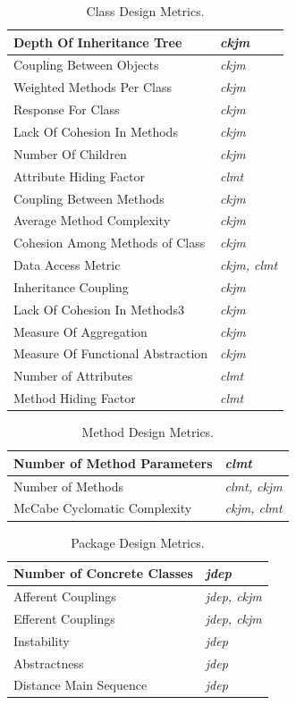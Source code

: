 \documentclass[conference]{IEEEtran}
\begin{document}
\begin{table}[!t]
\caption{Class Design Metrics.}
\label{tbl:class-selected-metrics}
\centering
\begin{tabular}{|l||l|}
\hline
Depth Of Inheritance Tree & \textit{ckjm}\\
\hline
Coupling Between Objects & \textit{ckjm}\\
\hline
Weighted Methods Per Class & \textit{ckjm}\\
\hline
Response For Class & \textit{ckjm}\\
\hline
Lack Of Cohesion In Methods & \textit{ckjm}\\
\hline
Number Of Children & \textit{ckjm}\\
\hline
Attribute Hiding Factor & \textit{clmt}\\
\hline
Coupling Between Methods & \textit{ckjm}\\
\hline
Average Method Complexity & \textit{ckjm}\\
\hline
Cohesion Among Methods of Class & \textit{ckjm}\\
\hline
Data Access Metric & \textit{ckjm, clmt}\\
\hline
Inheritance Coupling & \textit{ckjm}\\
\hline
Lack Of Cohesion In Methods3 & \textit{ckjm}\\
\hline
Measure Of Aggregation & \textit{ckjm}\\
\hline
Measure Of Functional Abstraction & \textit{ckjm}\\
\hline
Number of Attributes & \textit{clmt}\\
\hline
Method Hiding Factor & \textit{clmt}\\
\hline
\end{tabular}
\end{table}

\begin{table}[!t]
\caption{Method Design Metrics.}
\label{tbl:method-selected-metrics}
\centering
\begin{tabular}{|l||l|}
\hline
Number of Method Parameters & \textit{clmt}\\
\hline
Number of Methods & \textit{clmt, ckjm}\\
\hline
McCabe Cyclomatic Complexity & \textit{ckjm, clmt}\\
\hline
\end{tabular}
\end{table}

\begin{table}[!t]
\caption{Package Design Metrics.}
\label{tbl:package-selected-metrics}
\centering
\begin{tabular}{|l||l|}
\hline
Number of Concrete Classes & \textit{jdep}\\
\hline
Afferent Couplings & \textit{jdep, ckjm}\\
\hline
Efferent Couplings & \textit{jdep, ckjm}\\
\hline
Instability & \textit{jdep}\\
\hline
Abstractness & \textit{jdep}\\
\hline
Distance Main Sequence & \textit{jdep}\\
\hline
\end{tabular}
\end{table}
\end{document}
